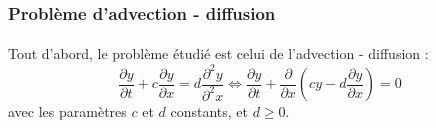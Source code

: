     \subsubsection{Problème d'advection - diffusion}
    \paragraph{}
    Tout d'abord, le problème étudié est celui de l'advection - diffusion :
    \begin{equation}
        \frac{\partial y}{\partial t} + c\frac{\partial y}{\partial x} = d\frac{\partial^2 y}{\partial^2 x}
        \Longleftrightarrow \frac{\partial y}{\partial t} + \frac{\partial}{\partial x}\left(cy - d\frac{\partial y}{\partial x}\right) = 0
    \label{eq:edp_advection_diffusion}
    \end{equation}
    avec les paramètres $c$ et $d$ constants, et $d \ge 0$.
    
